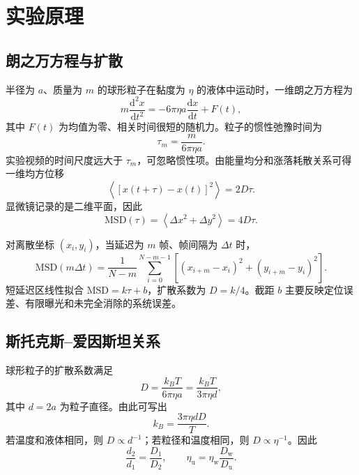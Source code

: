 \documentclass[11pt]{article}
\begin{document}
\section{实验原理}

\subsection{朗之万方程与扩散}

半径为 $a$、质量为 $m$ 的球形粒子在黏度为 $\eta$ 的液体中运动时，一维朗之万方程为
\begin{equation}
    m\frac{\mathrm d^2x}{\mathrm dt^2}
    =-6\pi\eta a\frac{\mathrm dx}{\mathrm dt}+F(t),
\end{equation}
其中 $F(t)$ 为均值为零、相关时间很短的随机力。粒子的惯性弛豫时间为
\begin{equation}
    \tau_m=\frac{m}{6\pi\eta a}.
\end{equation}
实验视频的时间尺度远大于 $\tau_m$，可忽略惯性项。由能量均分和涨落耗散关系可得一维均方位移
\begin{equation}
    \left\langle [x(t+\tau)-x(t)]^2\right\rangle=2D\tau.
\end{equation}
显微镜记录的是二维平面，因此
\begin{equation}
    \mathrm{MSD}(\tau)
    =\left\langle \Delta x^2+\Delta y^2\right\rangle
    =4D\tau .
    \label{eq:msd}
\end{equation}

对离散坐标 $(x_i,y_i)$，当延迟为 $m$ 帧、帧间隔为 $\Delta t$ 时，
\begin{equation}
    \mathrm{MSD}(m\Delta t)
    =\frac{1}{N-m}\sum_{i=0}^{N-m-1}
    \left[(x_{i+m}-x_i)^2+(y_{i+m}-y_i)^2\right].
\end{equation}
短延迟区线性拟合 $\mathrm{MSD}=k\tau+b$，扩散系数为 $D=k/4$。截距 $b$ 主要反映定位误差、有限曝光和未完全消除的系统误差。

\subsection{斯托克斯--爱因斯坦关系}

球形粒子的扩散系数满足
\begin{equation}
    D=\frac{k_BT}{6\pi\eta a}
     =\frac{k_BT}{3\pi\eta d},
    \label{eq:se}
\end{equation}
其中 $d=2a$ 为粒子直径。由此可写出
\begin{equation}
    k_B=\frac{3\pi\eta dD}{T}.
\end{equation}
若温度和液体相同，则 $D\propto d^{-1}$；若粒径和温度相同，则 $D\propto\eta^{-1}$。因此
\begin{equation}
    \frac{d_2}{d_1}=\frac{D_1}{D_2},\qquad
    \eta_{\mathrm u}=\eta_{\mathrm w}\frac{D_{\mathrm w}}{D_{\mathrm u}}.
    \label{eq:ratio}
\end{equation}
\end{document}
